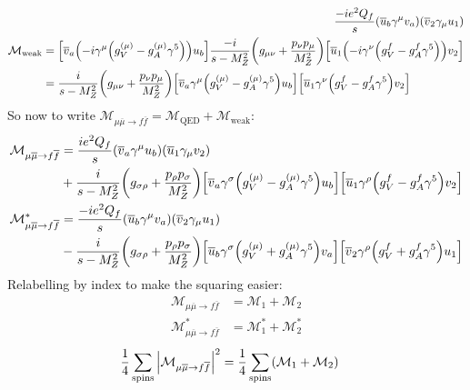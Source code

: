\documentclass[12 pt,draft]{article}
\renewcommand{\b}[1]{\overline{#1}}
\begin{document}
\begin{problem}[ $\mu\b{\mu}\rightarrow f\b{f}$]
\begin{align}
		\frac{-ie^2Q_f}{s}\qty(\b{u}_b\gamma^\mu v_a)\qty(\b{v}_2\gamma_\mu u_1)
		\\
		\begin{split}
			\mathcal{M}_\text{weak}&=
				\qty[
				\b{v}_a
				\qty(-i\gamma^\mu\qty(g_V^{(\mu)}-g_A^{(\mu)}\gamma^5))
				u_b
				]
				\frac{-i}{s-M_Z^2}
				\qty(g_{\mu\nu}+\frac{p_\nu p_\mu}{M_Z^2})
				\qty[\b{u}_1\qty(-i\gamma^\nu\qty(g_V^f-g_A^f\gamma^5))v_2]
				\\
				&=\frac{i}{s-M_Z^2}\qty(g_{\mu\nu}+\frac{p_\nu p_\mu}{M_Z^2})
				\qty[\b{v}_a\gamma^\mu\qty(g_V^{(\mu)}-g_A^{(\mu)}\gamma^5)u_b]
				\qty[\b{u}_1\gamma^\nu\qty(g_V^f-g_A^f\gamma^5)v_2]
		\end{split}
	\end{align}
	So now to write $\mathcal{M}_{\mu\b{\mu}\rightarrow{f\b{f}}}=\mathcal{M}_\text{QED}+\mathcal{M}_\text{weak}$:
	\begin{align}
		\begin{split}
			\mathcal{M}_{\mu\b{\mu}\rightarrow{f\b{f}}}
			&=
			\frac{ie^2Q_f}{s}
			\qty(\b{v}_a\gamma^\mu u_b)
			\qty(\b{u}_1\gamma_\mu v_2)
			\\&
			+\frac{i}{s-M_Z^2}\qty(g_{\sigma\rho}+\frac{p_\rho p_\sigma}{M_Z^2})
			\qty[\b{v}_a\gamma^\sigma\qty(g_V^{(\mu)}-g_A^{(\mu)}\gamma^5)u_b]
			\qty[\b{u}_1\gamma^\rho\qty(g_V^f-g_A^f\gamma^5)v_2]
		\end{split}
		\\
		\begin{split}
			\mathcal{M}_{\mu\b{\mu}\rightarrow{f\b{f}}}^*
			&=
			\frac{-ie^2Q_f}{s}
			\qty(\b{u}_b\gamma^\mu v_a)
			\qty(\b{v}_2\gamma_\mu u_1)
			\\&
			-\frac{i}{s-M_Z^2}\qty(g_{\sigma\rho}+\frac{p_\rho p_\sigma}{M_Z^2})
			\qty[\b{u}_b\gamma^\sigma\qty(g_V^{(\mu)}+g_A^{(\mu)}\gamma^5)v_a]
			\qty[\b{v}_2\gamma^\rho\qty(g_V^f+g_A^f\gamma^5)u_1]
		\end{split}
	\end{align}
	Relabelling by index to make the squaring easier:
	\begin{align}
		\mathcal{M}_{\mu\b{\mu}\rightarrow{f\b{f}}}
		&=\mathcal{M}_1+\mathcal{M}_2
		\\
		\mathcal{M}_{\mu\b{\mu}\rightarrow{f\b{f}}}^*
		&=\mathcal{M}_1^*+\mathcal{M}_2^*
	\end{align}
	\begin{align}
		\oo{4}\sum_\text{spins}\qty|\mathcal{M}_{\mu\b{\mu}\rightarrow{f\b{f}}}|^2
		&=\oo{4}\sum_\text{spins}(\mathcal{M}_1+\mathcal{M}_2)

\end{align}
\end{problem}
\end{document}
